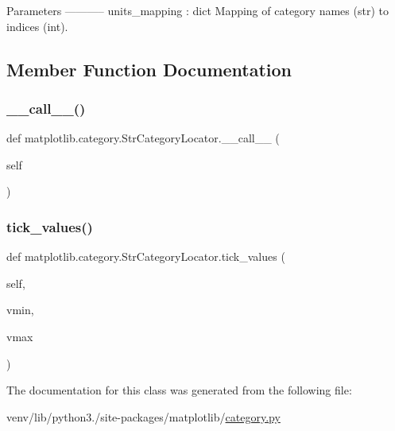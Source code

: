 \begin{DoxyVerb}Parameters
-----------
units_mapping : dict
    Mapping of category names (str) to indices (int).
\end{DoxyVerb}
 

\subsection{Member Function Documentation}
\mbox{\label{classmatplotlib_1_1category_1_1StrCategoryLocator_a85028e8d24c64c7b8a6f31b6a8334d76}} 
\subsubsection{\texorpdfstring{\+\_\+\+\_\+call\+\_\+\+\_\+()}{\_\_call\_\_()}}
{\footnotesize\ttfamily def matplotlib.\+category.\+Str\+Category\+Locator.\+\_\+\+\_\+call\+\_\+\+\_\+ (\begin{DoxyParamCaption}\item[{}]{self }\end{DoxyParamCaption})}

\mbox{\label{classmatplotlib_1_1category_1_1StrCategoryLocator_adb1272a173b277c65f67446e59ec332c}} 
\subsubsection{\texorpdfstring{tick\+\_\+values()}{tick\_values()}}
{\footnotesize\ttfamily def matplotlib.\+category.\+Str\+Category\+Locator.\+tick\+\_\+values (\begin{DoxyParamCaption}\item[{}]{self,  }\item[{}]{vmin,  }\item[{}]{vmax }\end{DoxyParamCaption})}



The documentation for this class was generated from the following file\+:\begin{DoxyCompactItemize}
\item 
venv/lib/python3./site-\/packages/matplotlib/\hyperlink{category_8py}{category.\+py}\end{DoxyCompactItemize}
